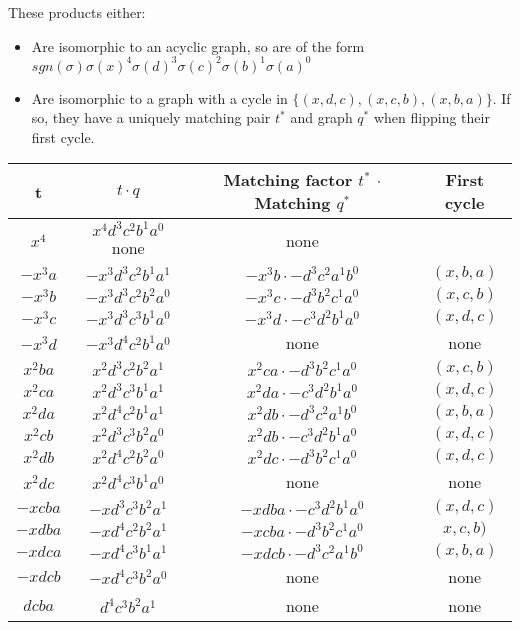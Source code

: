 \documentclass[11pt, oneside]{article} 	%
\begin{document}
These products either:
\begin{itemize}
\item Are isomorphic to an acyclic graph, so are of the form $sgn(\sigma)  \sigma(x)^{4} \sigma(d)^{3} \sigma(c)^{2} \sigma(b)^{1} \sigma(a)^0$
\item Are isomorphic to a graph with a cycle in $\{(x, d, c), (x,c,b), (x,b,a)\}$.  If so, they have a uniquely matching pair $t^*$ and graph $q^*$ when flipping their first cycle.
\end{itemize}



\begin{center}
\begin{tabular}{||c c c c||} 
 \hline
t & $t \cdot q$ & Matching factor $t^*$ $\cdot$ Matching $q^*$ & First cycle \\ [0.5ex] 
 \hline\hline
 $x^4$ & $x^4d^3c^2b^1a^0$ none & none \\ 
 \hline
 $-x^3a$ & $-x^3d^3c^2b^1a^1$ & $-x^3b \cdot -d^3c^2a^1b^0$ & $(x,b,a)$ \\ 
 \hline
 $-x^3b$ & $-x^3d^3c^2b^2a^0$ & $-x^3c \cdot -d^3b^2c^1a^0$ & $(x,c,b)$ \\ 
 \hline
 $-x^3c$ & $-x^3d^3c^3b^1a^0$ & $-x^3d \cdot -c^3d^2b^1a^0$ & $(x,d,c)$ \\ 
 \hline
 $-x^3d$ & $-x^3d^4c^2b^1a^0$ & none & none \\ 
 \hline
 $x^2ba$ & $x^2d^3c^2b^2a^1$ & $x^2ca \cdot -d^3b^2c^1a^0$ &  $(x,c,b)$ \\ 
  \hline
 $x^2ca$ & $x^2d^3c^3b^1a^1$ & $x^2da  \cdot -c^3d^2b^1a^0$ &  $(x,d,c)$ \\ 
 \hline
 $x^2da$ & $x^2d^4c^2b^1a^1$ & $x^2db  \cdot -d^3c^2a^1b^0$ &  $(x,b,a)$ \\ 

 \hline
 $x^2cb$ & $x^2d^3c^3b^2a^0$ & $x^2db  \cdot -c^3d^2b^1a^0$ &  $(x,d,c)$ \\ 
 \hline
 $x^2db$ & $x^2d^4c^2b^2a^0$ & $x^2dc  \cdot -d^3b^2c^1a^0$ &  $(x,d,c)$ \\ 
 
 
\hline
 $x^2dc$ & $x^2d^4c^3b^1a^0$ & none &   none \\ 
 
 \hline
 $-xcba$ & $-xd^3c^3b^2a^1$ & $-xdba  \cdot -c^3d^2b^1a^0$ &  $(x,d,c)$ \\ 

 \hline
 $-xdba$ & $-xd^4c^2b^2a^1$ & $-xcba  \cdot -d^3b^2c^1a^0$ &  $x,c,b)$ \\ 

 \hline
 $-xdca$ & $-xd^4c^3b^1a^1$ & $-xdcb  \cdot -d^3c^2a^1b^0$ &  $(x,b,a)$ \\ 

 \hline
 $-xdcb$ & $-xd^4c^3b^2a^0$ & none &  none \\ 
 
 
 \hline
 $dcba$ & $ d^4c^3b^2a^1 $ & none &  none \\ 
 
 \hline
\end{tabular}
\end{center}
\end{document}
